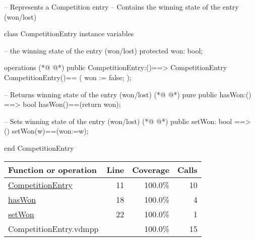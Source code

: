 \begin{vdmpp}[breaklines=true]
-- Represents a Competition entry
-- Contains the winning state of the entry (won/lost) 

class CompetitionEntry
instance variables

  -- the winning state of the entry (won/lost) 
  protected won: bool;
  
operations
(*@
\label{CompetitionEntry:11}
@*)
  public CompetitionEntry:()==> CompetitionEntry
  CompetitionEntry()== 
  (
    won := false;
  );
  
  -- Returns winning state of the entry (won/lost)
(*@
\label{hasWon:18}
@*)
  pure public hasWon:() ==> bool
    hasWon()==(return won);

   -- Sets winning state of the entry (won/lost)
(*@
\label{setWon:22}
@*)
   public setWon: bool ==> ()
   setWon(w)==(won:=w);
  
   
end CompetitionEntry
\end{vdmpp}
\bigskip
\begin{longtable}{|l|r|r|r|}
\hline
Function or operation & Line & Coverage & Calls \\
\hline
\hline
\hyperref[CompetitionEntry:11]{CompetitionEntry} & 11&100.0\% & 10 \\
\hline
\hyperref[hasWon:18]{hasWon} & 18&100.0\% & 4 \\
\hline
\hyperref[setWon:22]{setWon} & 22&100.0\% & 1 \\
\hline
\hline
CompetitionEntry.vdmpp & & 100.0\% & 15 \\
\hline
\end{longtable}

